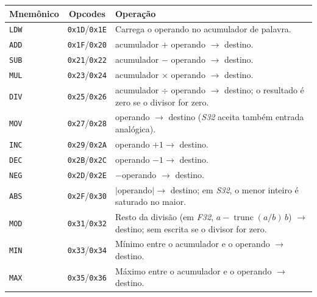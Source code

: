 \begin{quadrofixo}
    \centering
    \begin{tabular}{|l|c|p{9.4cm}|}
        \hline
        Mnemônico & Opcodes & Operação \\
        \hline
        \texttt{LDW} & \texttt{0x1D}/\texttt{0x1E} & Carrega o operando no acumulador de palavra. \\
        \hline
        \texttt{ADD} & \texttt{0x1F}/\texttt{0x20} & acumulador $+$ operando $\rightarrow$ destino. \\
        \hline
        \texttt{SUB} & \texttt{0x21}/\texttt{0x22} & acumulador $-$ operando $\rightarrow$ destino. \\
        \hline
        \texttt{MUL} & \texttt{0x23}/\texttt{0x24} & acumulador $\times$ operando $\rightarrow$ destino. \\
        \hline
        \texttt{DIV} & \texttt{0x25}/\texttt{0x26} & acumulador $\div$ operando $\rightarrow$ destino; o resultado é zero se o divisor for zero. \\
        \hline
        \texttt{MOV} & \texttt{0x27}/\texttt{0x28} & operando $\rightarrow$ destino (\textit{S32} aceita também entrada analógica). \\
        \hline
        \texttt{INC} & \texttt{0x29}/\texttt{0x2A} & operando $+ 1 \rightarrow$ destino. \\
        \hline
        \texttt{DEC} & \texttt{0x2B}/\texttt{0x2C} & operando $- 1 \rightarrow$ destino. \\
        \hline
        \texttt{NEG} & \texttt{0x2D}/\texttt{0x2E} & $-$operando $\rightarrow$ destino. \\
        \hline
        \texttt{ABS} & \texttt{0x2F}/\texttt{0x30} & $\lvert$operando$\rvert \rightarrow$ destino; em \textit{S32}, o menor inteiro é saturado no maior. \\
        \hline
        \texttt{MOD} & \texttt{0x31}/\texttt{0x32} & Resto da divisão (em \textit{F32}, $a - \operatorname{trunc}(a/b)\,b$) $\rightarrow$ destino; sem escrita se o divisor for zero. \\
        \hline
        \texttt{MIN} & \texttt{0x33}/\texttt{0x34} & Mínimo entre o acumulador e o operando $\rightarrow$ destino. \\
        \hline
        \texttt{MAX} & \texttt{0x35}/\texttt{0x36} & Máximo entre o acumulador e o operando $\rightarrow$ destino. \\
        \hline
    \end{tabular}
    \label{qua:ape-aritmetica}
\end{quadrofixo}

